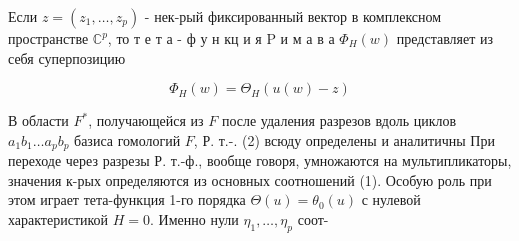 \documentclass[10pt]{article}
\begin{document}
Если $z=\left(z_{1}, \ldots, z_{p}\right)$ - нек-рый фиксированный вектор в комплексном пространстве $\mathbb{C}^{p}$, то т е т а - ф у н кц и я $\mathrm{P}$ и м а в а $\Phi_{H}(w)$ представляет из себя суперпозицию



\[

\Phi_{H}(w)=\Theta_{H}(u(w)-z)

\]



В области $F^{*}$, получающейся из $F$ после удаления разрезов вдоль циклов $a_{1} b_{1} \ldots a_{p} b_{p}$ базиса гомологий $F$, Р. т.-. (2) всюду определены и аналитичны При переходе через разрезы Р. т.-ф., вообще говоря, умножаются на мультипликаторы, значения к-рых определяются из основных соотношений (1). Особую роль при этом играет тета-функция 1-го порядка $\Theta(u)=\theta_{0}(u)$ с нулевой характеристикой $H=0$. Именно нули $\eta_{1}, \ldots, \eta_{p}$ соот-
\end{document}
